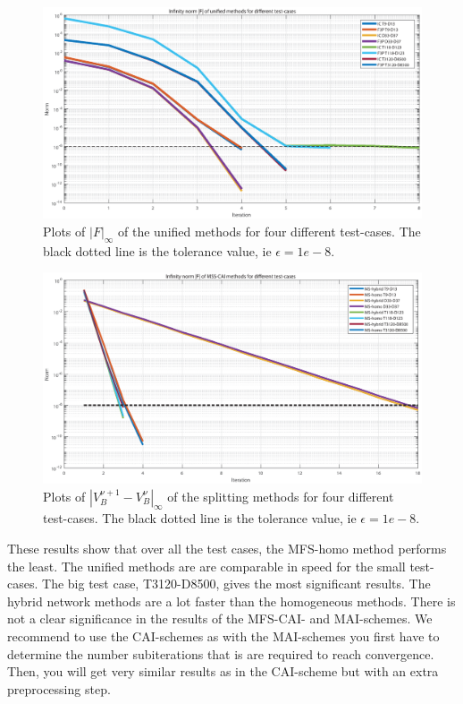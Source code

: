 \documentclass[10pt,journal]{article}
\begin{document}
%
\begin{figure}
    \centering
    \includegraphics[width=\textwidth]{Images/unifiednorms.eps}
    \caption{Plots of $|F|_\infty$ of the unified methods for four different test-cases. The black dotted line is the tolerance value, ie $\epsilon=1e-8$.}
    \label{fig:uninorm}
\end{figure}
\begin{figure}
    \centering
    \includegraphics[width=\textwidth]{Images/MSSCAInorms.eps}
    \caption{Plots of $|V_B^{\nu+1}-V_B^{\nu}|_\infty$ of the splitting methods for four different test-cases. The black dotted line is the tolerance value, ie $\epsilon=1e-8$.}
    \label{fig:MFSnorm}
\end{figure}
\noindent These results show that over all the test cases, the MFS-homo method performs the least. The unified methods are are comparable in speed for the small test-cases. The big test case, T3120-D8500, gives the most significant results. The hybrid network methods are a lot faster than the homogeneous methods. \newline \newline
There is not a clear significance in the results of the MFS-CAI- and MAI-schemes. We recommend to use the CAI-schemes as with the MAI-schemes you first have to determine the number subiterations that is are required to reach convergence. Then, you will get very similar results as in the CAI-scheme but with an extra preprocessing step.  
\end{document}
